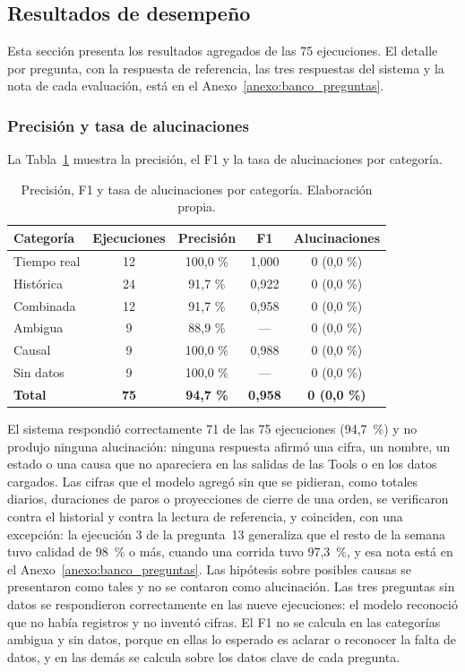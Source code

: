 \subsection{Resultados de desempeño}
\label{resultadosvalidacion}

Esta sección presenta los resultados agregados de las 75 ejecuciones. El detalle por pregunta, con la respuesta de referencia, las tres respuestas del sistema y la nota de cada evaluación, está en el Anexo~\ref{anexo:banco_preguntas}.

\subsubsection{Precisión y tasa de alucinaciones}

La Tabla~\ref{tab:res_precision} muestra la precisión, el F1 y la tasa de alucinaciones por categoría.

\begin{table}[H]
\centering
\caption{Precisión, F1 y tasa de alucinaciones por categoría. Elaboración propia.}
\label{tab:res_precision}
\small
\renewcommand{\arraystretch}{1.3}
\begin{tabular}{lcccc}
\hline
\textbf{Categoría} & \textbf{Ejecuciones} & \textbf{Precisión} & \textbf{F1} & \textbf{Alucinaciones} \\
\hline
Tiempo real & 12 & 100,0 \% & 1,000 & 0 (0,0 \%) \\
Histórica & 24 & 91,7 \% & 0,922 & 0 (0,0 \%) \\
Combinada & 12 & 91,7 \% & 0,958 & 0 (0,0 \%) \\
Ambigua & 9 & 88,9 \% & --- & 0 (0,0 \%) \\
Causal & 9 & 100,0 \% & 0,988 & 0 (0,0 \%) \\
Sin datos & 9 & 100,0 \% & --- & 0 (0,0 \%) \\
\hline
\textbf{Total} & \textbf{75} & \textbf{94,7 \%} & \textbf{0,958} & \textbf{0 (0,0 \%)} \\
\hline
\end{tabular}
\end{table}

El sistema respondió correctamente 71 de las 75 ejecuciones (94,7~\%) y no produjo ninguna alucinación: ninguna respuesta afirmó una cifra, un nombre, un estado o una causa que no apareciera en las salidas de las Tools o en los datos cargados. Las cifras que el modelo agregó sin que se pidieran, como totales diarios, duraciones de paros o proyecciones de cierre de una orden, se verificaron contra el historial y contra la lectura de referencia, y coinciden, con una excepción: la ejecución 3 de la pregunta~13 generaliza que el resto de la semana tuvo calidad de 98~\% o más, cuando una corrida tuvo 97,3~\%, y esa nota está en el Anexo~\ref{anexo:banco_preguntas}. Las hipótesis sobre posibles causas se presentaron como tales y no se contaron como alucinación. Las tres preguntas sin datos se respondieron correctamente en las nueve ejecuciones: el modelo reconoció que no había registros y no inventó cifras. El F1 no se calcula en las categorías ambigua y sin datos, porque en ellas lo esperado es aclarar o reconocer la falta de datos, y en las demás se calcula sobre los datos clave de cada pregunta.

